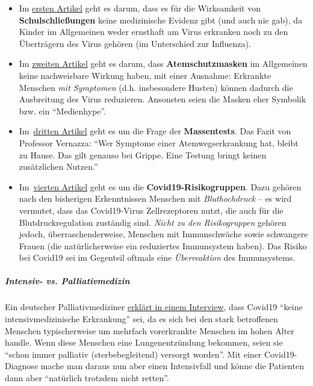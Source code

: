 \begin{itemize}
\tightlist
\item
  Im
  \href{https://infekt.ch/2020/04/schulen-schliessen-hilfreich-oder-nicht/}{ersten
  Artikel} geht es darum, dass es für die Wirksamkeit von
  \textbf{Schulschließungen} keine medizinische Evidenz gibt (und auch
  nie gab), da Kinder im Allgemeinen weder ernsthaft am Virus erkranken
  noch zu den Überträgern des Virus gehören (im Unterschied zur
  Influenza).
\item
  Im
  \href{https://infekt.ch/2020/04/atemschutzmasken-fuer-alle-medienhype-oder-unverzichtbar/}{zweiten
  Artikel} geht es darum, dass \textbf{Atemschutzmasken} im Allgemeinen
  keine nachweisbare Wirkung haben, mit einer Ausnahme: Erkrankte
  Menschen \emph{mit Symptomen} (d.h. insbesondere Husten) können
  dadurch die Ausbreitung des Virus reduzieren. Ansonsten seien die
  Masken eher Symbolik bzw. ein ``Medienhype''.
\item
  Im~\href{https://infekt.ch/2020/04/corona-testen-testen-und-kein-ende/}{dritten
  Artikel} geht es um die Frage der \textbf{Massentests}. Das Fazit von
  Professor Vernazza: ``Wer Symptome einer Atemwegserkrankung hat,
  bleibt zu Hause. Das gilt genauso bei Grippe. Eine Testung bringt
  keinen zusätzlichen Nutzen.''
\item
  Im~\href{https://infekt.ch/2020/03/immunschwaeche-und-schwangerschaft-kein-covid-19-risikofaktor/}{vierten
  Artikel} geht es um die \textbf{Covid19-Risikogruppen}. Dazu gehören
  nach den bisherigen Erkenntnissen Menschen mit \emph{Bluthochdruck} --
  es wird vermutet, dass das Covid19-Virus Zellrezeptoren nutzt, die
  auch für die Blutdruckregulation zuständig sind. \emph{Nicht zu den
  Risikogruppen} gehören jedoch, überraschenderweise, Menschen mit
  Immunschwäche sowie schwangere Frauen (die natürlicherweise ein
  reduziertes Immunsystem haben). Das Risiko bei Covid19 sei im
  Gegenteil oftmals eine \emph{Überreaktion} des Immunsystems.
\end{itemize}

\hypertarget{intensiv--vs-palliativmedizin}{%
\subparagraph{\texorpdfstring{\textbf{Intensiv- vs.
Palliativmedizin}}{Intensiv- vs. Palliativmedizin}}\label{intensiv--vs-palliativmedizin}}

Ein deutscher Palliativmediziner
\href{https://www.ruhr24.de/ruhrgebiet/coronavirus-behandlung-intensivstation-nrw-lungenentzuendung-matthias-thoens-witten-zr-13645038.html}{erklärt
in einem Interview}, dass Covid19 ``keine intensiv­medizinische
Erkrankung'' sei, da es sich bei den stark betroffenen Menschen
typischerweise um mehrfach vorerkrankte Menschen im hohen Alter handle.
Wenn diese Menschen eine Lungenentzündung bekommen, seien sie ``schon
immer palliativ (sterbebegleitend) versorgt worden''. Mit einer
Covid19-Diagnose mache man daraus nun aber einen Intensivfall und könne
die Patienten dann aber ``natürlich trotzdem nicht retten''.

